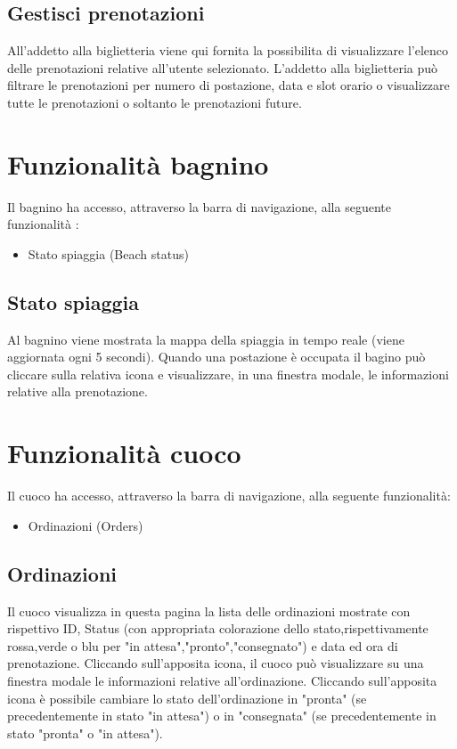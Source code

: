 \documentclass{article}
\begin{document}
\subsection{Gestisci prenotazioni}
All'addetto alla biglietteria viene qui fornita la possibilita di visualizzare l'elenco delle prenotazioni relative all'utente selezionato. L'addetto alla biglietteria può filtrare le prenotazioni per numero di postazione, data e slot orario o visualizzare tutte le prenotazioni o soltanto le prenotazioni future.
\section{Funzionalità bagnino}
Il bagnino ha accesso, attraverso la barra di navigazione, alla seguente funzionalità :
\begin{itemize}
	\item Stato spiaggia (Beach status)
\end{itemize} 
\subsection{Stato spiaggia}
Al bagnino viene mostrata la mappa della spiaggia in tempo reale (viene aggiornata ogni 5 secondi). Quando una postazione è occupata il bagino può cliccare sulla relativa icona e visualizzare, in una finestra modale, le informazioni relative alla prenotazione.
\section{Funzionalità cuoco}
Il cuoco ha accesso, attraverso la barra di navigazione, alla seguente funzionalità:
\begin{itemize}
	\item Ordinazioni (Orders)
\end{itemize} 
\newpage
\subsection{Ordinazioni}
Il cuoco visualizza in questa pagina la lista delle ordinazioni mostrate con rispettivo ID, Status (con appropriata colorazione dello stato,rispettivamente rossa,verde o blu per "in attesa","pronto","consegnato")  e data ed ora di prenotazione.
Cliccando sull'apposita icona, il cuoco può visualizzare su una finestra modale le informazioni relative all'ordinazione. Cliccando sull'apposita icona è possibile cambiare lo stato dell'ordinazione in "pronta" (se precedentemente in stato "in attesa") o in "consegnata" (se precedentemente in stato "pronta" o "in attesa").
\end{document}

